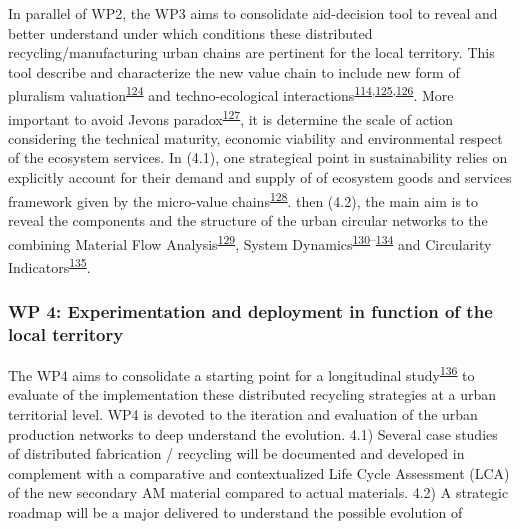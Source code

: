 \documentclass[
  12pt,
  a4paperpaper,
  onecolumn]{article}
\begin{document}
In parallel of WP2, the WP3 aims to consolidate aid-decision tool to
reveal and better understand under which conditions these distributed
recycling/manufacturing urban chains are pertinent for the local
territory. This tool describe and characterize the new value chain to
include new form of pluralism
valuation\textsuperscript{\protect\hyperlink{ref-gunton2022}{124}} and
techno-ecological
interactions\textsuperscript{\protect\hyperlink{ref-Saladini2018}{114},\protect\hyperlink{ref-Liu2020c}{125},\protect\hyperlink{ref-Liu2019g}{126}}.
More important to avoid Jevons
paradox\textsuperscript{\protect\hyperlink{ref-giampietro2018}{127}}, it
is determine the scale of action considering the technical maturity,
economic viability and environmental respect of the ecosystem services.
In (4.1), one strategical point in sustainability relies on explicitly
account for their demand and supply of of ecosystem goods and services
framework given by the micro-value
chains\textsuperscript{\protect\hyperlink{ref-Diwekar2021}{128}}. then
(4.2), the main aim is to reveal the components and the structure of the
urban circular networks to the combining Material Flow
Analysis\textsuperscript{\protect\hyperlink{ref-saidani2021}{129}},
System
Dynamics\textsuperscript{\protect\hyperlink{ref-kuo2021}{130}--\protect\hyperlink{ref-perez-perez2021}{134}}
and Circularity
Indicators\textsuperscript{\protect\hyperlink{ref-saidani2019}{135}}.

\hypertarget{wp-4-experimentation-and-deployment-in-function-of-the-local-territory}{%
\subsubsection{WP 4: Experimentation and deployment in function of the
local
territory}\label{wp-4-experimentation-and-deployment-in-function-of-the-local-territory}}

The WP4 aims to consolidate a starting point for a longitudinal
study\textsuperscript{\protect\hyperlink{ref-langley2013}{136}} to
evaluate of the implementation these distributed recycling strategies at
a urban territorial level. WP4 is devoted to the iteration and
evaluation of the urban production networks to deep understand the
evolution. 4.1) Several case studies of distributed fabrication /
recycling will be documented and developed in complement with a
comparative and contextualized Life Cycle Assessment (LCA) of the new
secondary AM material compared to actual materials. 4.2) A strategic
roadmap will be a major delivered to understand the possible evolution
of
\end{document}
